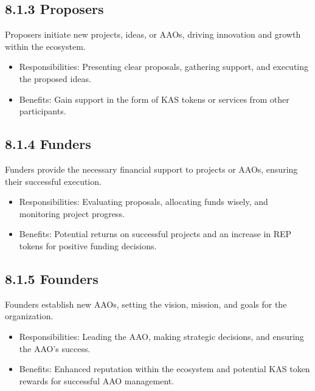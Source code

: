 \documentclass[10pt]{article}
\begin{document}
\subsection*{8.1.3 Proposers}
Proposers initiate new projects, ideas, or AAOs, driving innovation and growth within the ecosystem.

\begin{itemize}
  \item Responsibilities: Presenting clear proposals, gathering support, and executing the proposed ideas.
  \item Benefits: Gain support in the form of KAS tokens or services from other participants.
\end{itemize}

\subsection*{8.1.4 Funders}
Funders provide the necessary financial support to projects or AAOs, ensuring their successful execution.

\begin{itemize}
  \item Responsibilities: Evaluating proposals, allocating funds wisely, and monitoring project progress.
  \item Benefits: Potential returns on successful projects and an increase in REP tokens for positive funding decisions.
\end{itemize}

\subsection*{8.1.5 Founders}
Founders establish new AAOs, setting the vision, mission, and goals for the organization.

\begin{itemize}
  \item Responsibilities: Leading the AAO, making strategic decisions, and ensuring the AAO's success.
  \item Benefits: Enhanced reputation within the ecosystem and potential KAS token rewards for successful AAO management.
\end{itemize}
\end{document}
